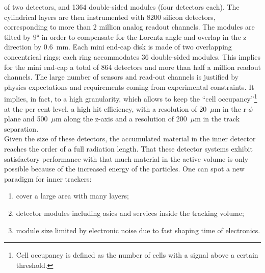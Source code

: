 of two detectors, and 1364 double-sided modules (four detectors each). The
cylindrical layers are then instrumented with 8200 silicon detectors,
corresponding to more than 2 million analog readout channels. The modules are
tilted by $\ang{9}$ in order to compensate for the Lorentz angle and overlap in
the z direction by 0.6~mm. Each mini end-cap disk is made of two overlapping
concentrical rings; each ring accommodates 36 double-sided modules. This implies
for the mini end-cap a total of 864 detectors and more than half a million
readout channels. The large number of sensors and read-out channels is justified
by physics expectations and requirements coming from experimental
constraints. It implies, in fact, to a high granularity, which allows to keep
the ``cell occupancy''\footnote{Cell occupancy is defined as the number of cells
  with a signal above a certain threshold.} at the per cent level, a high hit
efficiency, with a resolution of 20~$\mu$m in the r-$\phi$ plane and 500~$\mu$m
along the z-axis and a resolution of 200~$\mu$m in the
track separation.\\

Given the size of these detectors, the accumulated material in the inner
detector reaches the order of a full radiation length. That these detector
systems exhibit satisfactory performance with that much material in the active
volume is only possible because of the increased energy of the particles. One
can spot a new paradigm for inner trackers:
\begin{enumerate}
\item cover a large area with many layers;
\item detector modules including \glspl{asic} and services inside the tracking
  volume;
\item module size limited by electronic noise due to fast shaping time of
  electronics.
\end{enumerate}

